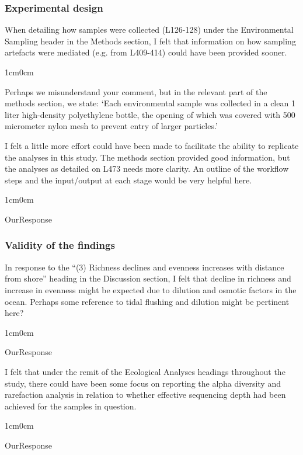 \documentclass{article}
\newenvironment{response}
	{
	\begin{adjustwidth}{1cm}{0cm}
	\color{peerjBlue}
	}
	{
	\end{adjustwidth}
	}
\begin{document}
\subsubsection*{Experimental design}
When detailing how samples were collected (L126-128) under the Environmental Sampling header in the Methods section, I felt that information on how sampling artefacts were mediated (e.g. from L409-414) could have been provided sooner.
\begin{response}
  Perhaps we misunderstand your comment, but in the relevant part of the methods section, we state: `Each environmental sample was collected in a clean 1 liter high-density polyethylene bottle, the opening of which was covered with 500 micrometer nylon mesh to prevent entry of larger particles.'\\
\end{response}

I felt a little more effort could have been made to facilitate the ability to replicate the analyses in this study. The methods section provided good information, but the analyses as detailed on L473 needs more clarity. An outline of the workflow steps and the input/output at each stage would be very helpful here.
\begin{response}
  OurResponse\\
\end{response}

\subsubsection*{Validity of the findings}
In response to the ``(3) Richness declines and evenness increases with distance from shore'' heading in the Discussion section, I felt that decline in richness and increase in evenness might be expected due to dilution and osmotic factors in the ocean. Perhaps some reference to tidal flushing and dilution might be pertinent here?
\begin{response}
  OurResponse\\
\end{response}

I felt that under the remit of the Ecological Analyses headings throughout the study, there could have been some focus on reporting the alpha diversity and rarefaction analysis in relation to whether effective sequencing depth had been achieved for the samples in question.
\begin{response}
  OurResponse\\
\end{response}
\end{document}
